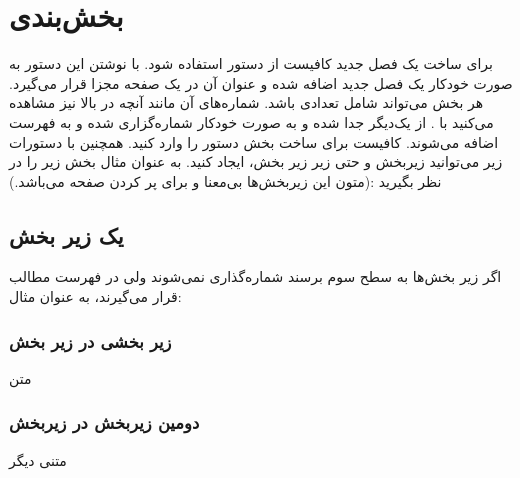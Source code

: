 \section{بخش‌بندی}
برای ساخت یک فصل جدید کافیست از دستور
 \RTL{} \noindent
استفاده شود. با نوشتن این دستور به صورت خودکار یک فصل جدید اضافه شده و عنوان آن در یک صفحه مجزا قرار می‌گیرد.
هر بخش می‌تواند شامل تعدادی  باشد. شماره‌های آن مانند آنچه در بالا نیز مشاهده می‌کنید با . از یک‌دیگر جدا شده و به صورت خودکار شماره‌گزاری  شده و به فهرست اضافه می‌شوند. کافیست برای ساخت بخش دستور 
 \RTL{}\noindent
را وارد کنید. همچنین با دستورات زیر می‌توانید زیربخش و حتی زیر زیر بخش، ایجاد کنید.
 \RTL{}
 \RTL{}\noindent
به عنوان مثال بخش زیر را در نظر بگیرید :(متون این زیربخش‌ها بی‌معنا و برای پر کردن صفحه می‌باشد.)

\subsection{یک زیر بخش}
اگر زیر بخش‌ها به سطح سوم برسند شماره‌گذاری نمی‌شوند ولی در فهرست مطالب قرار می‌گیرند، به عنوان مثال:
\subsubsection{زیر بخشی در زیر بخش}
متن
\subsubsection{ دومین زیربخش در زیربخش}
متنی دیگر

